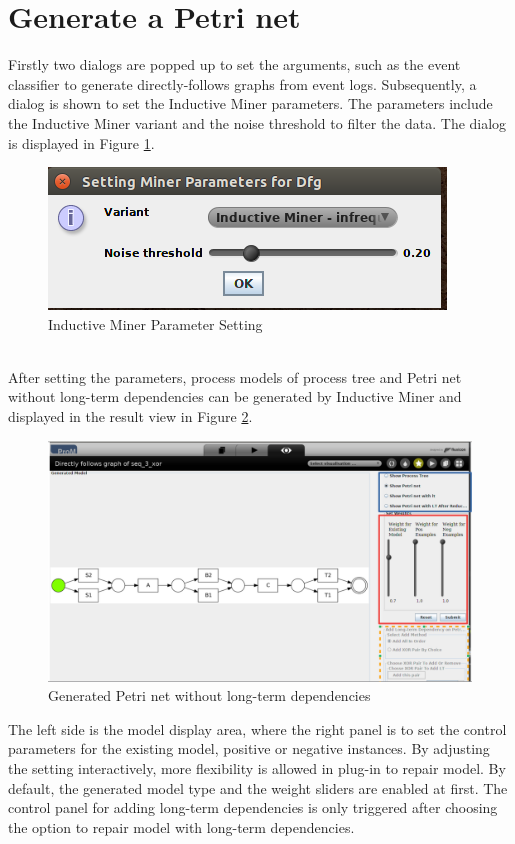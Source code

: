\section{Generate a Petri net}
Firstly two dialogs are popped up to set the arguments, such as the event classifier to  generate directly-follows graphs from event logs. Subsequently, a dialog is shown to set the Inductive Miner parameters. The parameters include the Inductive Miner variant and the noise threshold to filter the data. The dialog is displayed in Figure \ref{fig:dfg-IM-setting}.
\begin{figure}
	\centering
	\includegraphics[scale=0.75]{figures/implementation/dfg-IM-setting.png}
	\caption{Inductive Miner Parameter Setting}
	\label{fig:dfg-IM-setting}
\end{figure} \\
After setting the parameters, process models  of process tree and Petri net without long-term dependencies can be generated by Inductive Miner and displayed in the result view in Figure \ref{fig:dfg-IM-pn-without-lt}. 
\begin{figure}
	\centering
	\includegraphics[width=\textwidth]{figures/implementation/dfg-IM-pn-without-lt.png}
	\caption{Generated Petri net without long-term dependencies}
	\label{fig:dfg-IM-pn-without-lt}
\end{figure}
The left side is the model display area, where the right panel is to set the control parameters for the existing model, positive or negative instances. By adjusting the setting interactively, more flexibility is allowed in plug-in to repair model. By default, the generated model type and the weight sliders are enabled at first. The control panel for adding long-term dependencies is only triggered after choosing the option to repair model with long-term dependencies. 

